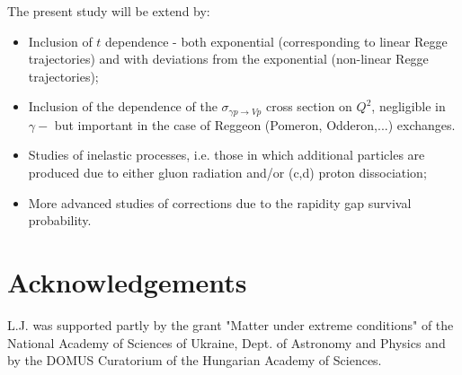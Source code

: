 \documentclass[12pt]{article}
\begin{document}
The present study will be extend by:
\begin{itemize}
\item Inclusion of $t$ dependence - both exponential (corresponding to linear Regge trajectories) and with deviations from the exponential (non-linear Regge trajectories);
\item Inclusion of the dependence of the $\sigma_{\gamma p \rightarrow V p}$ cross section on $Q^2$, negligible in $\gamma-$ but important in the case of Reggeon (Pomeron, Odderon,...) exchanges.
\item Studies of inelastic processes, i.e. those in which additional particles are produced due to either gluon radiation and/or (c,d) proton dissociation;
\item More advanced studies of corrections due to the rapidity gap survival probability.
\end{itemize}


 \section*{Acknowledgements}
L.J. was supported partly by the grant "Matter under extreme conditions" of the
National Academy of Sciences of Ukraine, Dept. of Astronomy and
Physics and by the DOMUS Curatorium of the Hungarian Academy of Sciences.
\end{document}
